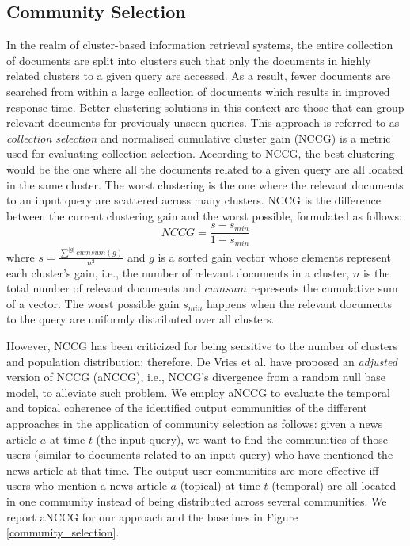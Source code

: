 \documentclass[sigconf]{acmart}
\begin{document}
\subsection{Community Selection}
In the realm of cluster-based information retrieval systems, the entire collection of documents are split into clusters such that only the documents in highly related clusters to a given query are accessed. As a result, fewer documents are searched from within a large collection of documents which results in improved response time. Better clustering solutions in this context are those that can group relevant documents for previously unseen queries. This approach is referred to as \textit{collection selection} and normalised cumulative cluster gain (NCCG) \cite{DBLP:conf/inex/NayakVKGDG09} is a metric used for evaluating collection selection. According to NCCG, the best clustering would be the one where all the documents related to a given query are all located in the same cluster. The worst clustering is the one where the relevant documents to an input query are scattered across many clusters. NCCG is the difference between the current clustering gain and the worst possible, formulated as follows:
\begin{equation}
NCCG=\frac{s-s_{min}}{1-s_{min}}    
\end{equation}
where $s=\frac{\sum\limits^{|g|}{cumsum(g)}}{n^2}$ and $g$ is a sorted gain vector whose elements represent each cluster's gain, i.e., the number of relevant documents in a cluster, $n$ is the total number of relevant documents and $cumsum$ represents the cumulative sum of a vector. The worst possible gain $s_{min}$ happens when the relevant documents to the query are uniformly distributed over all clusters. 

However, NCCG has been criticized for being sensitive to the number of clusters and population distribution; therefore, De Vries et al. \cite{DBLP:journals/corr/abs-1208-5654} have proposed an \textit{adjusted} version of NCCG (aNCCG), i.e., NCCG's divergence from a random null base model, to alleviate such problem. We employ aNCCG to evaluate the temporal and topical coherence of the identified output communities of the different approaches in the application of community selection as follows: given a news article $a$ at time $t$ (the input query), we want to find the communities of those users (similar to documents related to an input query) who have mentioned the news article at that time. The output user communities are more effective iff users who mention a news article $a$ (topical) at time $t$ (temporal) are all located in one community instead of being distributed across several communities. We report aNCCG for our approach and the baselines in Figure \ref{community_selection}. 
\end{document}

